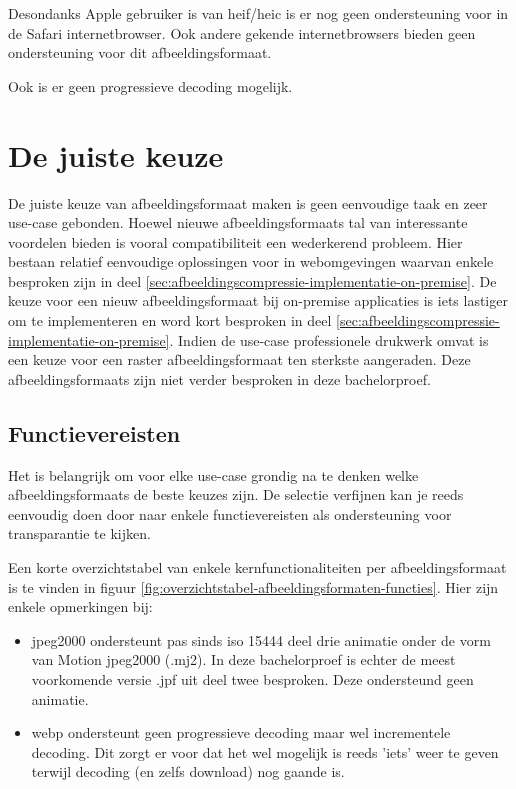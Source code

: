 Desondanks Apple gebruiker is van \gls{heif}/\gls{heic} is er nog geen ondersteuning voor in de Safari internetbrowser. Ook andere gekende internetbrowsers bieden geen ondersteuning voor dit \gls{afbeeldingsformaat}.

Ook is er geen progressieve \gls{decoding} mogelijk.

\section{De juiste keuze}
\label{sec:afbeeldingscompressie-keuze}

De juiste keuze van \gls{afbeeldingsformaat} maken is geen eenvoudige taak en zeer \gls{use-case} gebonden. Hoewel nieuwe \glspl{afbeeldingsformaat} tal van interessante voordelen bieden is vooral compatibiliteit een wederkerend probleem. Hier bestaan relatief eenvoudige oplossingen voor in webomgevingen waarvan enkele besproken zijn in deel \ref{sec:afbeeldingscompressie-implementatie-on-premise}. De keuze voor een nieuw \gls{afbeeldingsformaat} bij \gls{on-premise} applicaties is iets lastiger om te implementeren en word kort besproken in deel \ref{sec:afbeeldingscompressie-implementatie-on-premise}. Indien de \gls{use-case} professionele drukwerk omvat is een keuze voor een \gls{raster} \gls{afbeeldingsformaat} ten sterkste aangeraden. Deze \glspl{afbeeldingsformaat} zijn niet verder besproken in deze bachelorproef.

\subsection{Functievereisten}
\label{sec:afbeeldingscompressie-functievereisten}

Het is belangrijk om voor elke \gls{use-case} grondig na te denken welke \glspl{afbeeldingsformaat} de beste keuzes zijn. De selectie verfijnen kan je reeds eenvoudig doen door naar enkele functievereisten als ondersteuning voor transparantie te kijken. 

Een korte overzichtstabel van enkele kernfunctionaliteiten per \gls{afbeeldingsformaat} is te vinden in figuur \ref{fig:overzichtstabel-afbeeldingsformaten-functies}. Hier zijn enkele opmerkingen bij:

\begin{itemize}
	\item \gls{jpeg2000} ondersteunt pas sinds \gls{iso} 15444 deel drie animatie onder de vorm van Motion \gls{jpeg2000} (.mj2). In deze bachelorproef is echter de meest voorkomende versie .jpf uit deel twee besproken. Deze ondersteund geen animatie.
	
	\item \Gls{webp} ondersteunt geen progressieve \gls{decoding} maar wel incrementele \gls{decoding}. Dit zorgt er voor dat het wel mogelijk is reeds 'iets' weer te geven terwijl \gls{decoding} (en zelfs download) nog gaande is.
\end{itemize}

